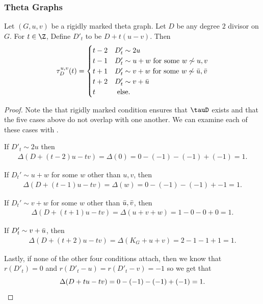 \subsubsection{Theta Graphs}
\begin{prop}\label{prop-thetaTransChar}
Let $(G,u,v)$ be a rigidly marked theta graph. Let $D$ be any degree $2$ divisor on $G$. For $t \in \Z$, Define $D'_t$ to be $D+t(u-v)$. Then
\begin{align*}
    \tau_D^{u,v}(t) = \begin{cases}
    t-2 & D'_t \sim 2u\\
    t-1 & D'_t \sim u +w \text{ for some } w \not \sim u,v\\
    t+1 & D'_t \sim v+w \text{ for some } w \not \sim \Bar{u},\Bar{v}\\
    t+2 & D'_t \sim v+\Bar{u}\\
    t & \text{ else}.
    \end{cases}
\end{align*}

\end{prop}

\begin{proof}
Note the that rigidly marked condition ensures that $\tauD$ exists and that the five cases above do not overlap with one another. We can examine each of these cases with .

If $D'_t \sim 2u$ then
\begin{align*}
    \Delta(D + (t-2)u-tv) = \Delta(0) = 0-(-1)-(-1)+(-1) = 1.
\end{align*}

If $D_t' \sim u+w$ for some $w$ other than $u,v$, then
\begin{align*}
    \Delta(D+(t-1)u-tv) =\Delta(w) = 0-(-1)-(-1)+-1 = 1.
\end{align*}

If $D_t' \sim v+w$ for some $w$ other than $\Bar{u},\Bar{v}$, then
\begin{align*}
    \Delta(D+(t+1)u-tv) = \Delta(u+v+w) = 1-0-0+0 = 1.
\end{align*}

If $D_t' \sim v+\Bar{u}$, then
\begin{align*}
    \Delta(D+(t+2)u-tv) = \Delta(K_G+u+v) = 2-1-1+1 = 1.
\end{align*}

Lastly, if none of the other four conditions attach, then we know that $r(D'_t) = 0$ and $r(D'_t-u) = r(D'_t-v) = -1$ so we get that
\[
    \Delta(D+tu-tv) = 0-(-1)-(-1) +(-1) = 1. \qedhere
\]
\end{proof}

